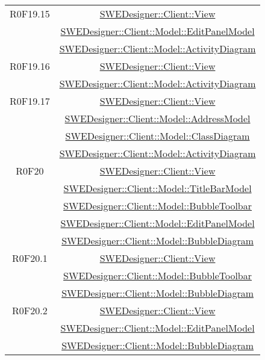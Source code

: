 \documentclass[../SpecificaTecnica.tex]{subfiles}
\begin{document}
\begin{longtable}{|c|c|}
		R0F19.15 & \hyperlink{SWEDesigner::Client::View}{SWEDesigner::Client::View} \\& \hyperlink{SWEDesigner::Client::Model::EditPanelModel}{SWEDesigner::Client::Model::EditPanelModel} \\& \hyperlink{SWEDesigner::Client::Model::ActivityDiagram}{SWEDesigner::Client::Model::ActivityDiagram} \\\hline
		R0F19.16 & \hyperlink{SWEDesigner::Client::View}{SWEDesigner::Client::View} \\& \hyperlink{SWEDesigner::Client::Model::ActivityDiagram}{SWEDesigner::Client::Model::ActivityDiagram}\\\hline
		R0F19.17 & \hyperlink{SWEDesigner::Client::View}{SWEDesigner::Client::View} \\& \hyperlink{SWEDesigner::Client::Model::AddressModel}{SWEDesigner::Client::Model::AddressModel} \\& \hyperlink{SWEDesigner::Client::Model::ClassDiagram}{SWEDesigner::Client::Model::ClassDiagram} \\& \hyperlink{SWEDesigner::Client::Model::ActivityDiagram}{SWEDesigner::Client::Model::ActivityDiagram} \\\hline
		R0F20 & \hyperlink{SWEDesigner::Client::View}{SWEDesigner::Client::View} \\& \hyperlink{SWEDesigner::Client::Model::TitleBarModel}{SWEDesigner::Client::Model::TitleBarModel} \\& \hyperlink{SWEDesigner::Client::Model::BubbleToolbar}{SWEDesigner::Client::Model::BubbleToolbar} \\& \hyperlink{SWEDesigner::Client::Model::EditPanelModel}{SWEDesigner::Client::Model::EditPanelModel} \\& \hyperlink{SWEDesigner::Client::Model::BubbleDiagram}{SWEDesigner::Client::Model::BubbleDiagram}\\\hline
		R0F20.1 & \hyperlink{SWEDesigner::Client::View}{SWEDesigner::Client::View} \\& \hyperlink{SWEDesigner::Client::Model::BubbleToolbar}{SWEDesigner::Client::Model::BubbleToolbar} \\& \hyperlink{SWEDesigner::Client::Model::BubbleDiagram}{SWEDesigner::Client::Model::BubbleDiagram}\\\hline
		R0F20.2 & \hyperlink{SWEDesigner::Client::View}{SWEDesigner::Client::View} \\& \hyperlink{SWEDesigner::Client::Model::EditPanelModel}{SWEDesigner::Client::Model::EditPanelModel} \\& \hyperlink{SWEDesigner::Client::Model::BubbleDiagram}{SWEDesigner::Client::Model::BubbleDiagram}\\\hline

\end{longtable}
\end{document}
